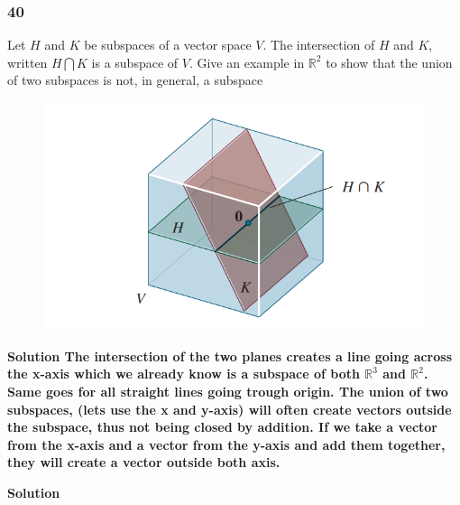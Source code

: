     
    
    \subsubsection*{40}
    Let $ H $ and  $ K $ be subspaces of a vector space $ V $. The intersection of $ H $ and $ K $, written $ H \bigcap K $ is a subspace of $ V $. Give an example in $ \mathbb R^{2}  $ to show that the union of two subspaces is not, in general, a subspace 
    \begin{figure}[h!]
      \centering
      \includegraphics[scale = .7]{Bilder/HK_intersect.png}
      \caption{}
      \label{fig:figure1}
    \end{figure}
    \newline \newline 

    \bf{Solution} \newline \newline 
    The intersection of the two planes creates a line going across the x-axis which we already know is a subspace of both $ \mathbb R^{3} $ and $ \mathbb R^{2} $. Same goes for all straight lines going trough origin. \newline 
    The union of two subspaces, (lets use the x and y-axis) will often create vectors outside the subspace, thus not being closed by addition. If we take a vector from the x-axis and a vector from the y-axis and add them together, they will create a vector outside both axis. 

    \bf{Solution} \newline \newline 
